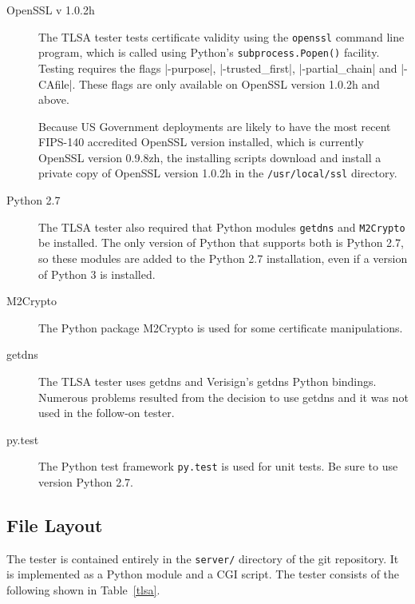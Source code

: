\documentclass[preprint,3p]{elsarticle}
\begin{document}
\begin{description}
\item[OpenSSL v 1.0.2h]
The TLSA tester tests certificate validity using the \verb+openssl+
command line program, which is called using Python's \verb+subprocess.Popen()+
facility. Testing requires the flags |-purpose|, |-trusted_first|,
|-partial_chain| and |-CAfile|. These flags are only available on
OpenSSL version 1.0.2h and above.

Because US Government deployments are likely to have the
most recent FIPS-140 accredited OpenSSL version installed, which is
currently OpenSSL version 0.9.8zh, the installing scripts download and
install a private copy of OpenSSL version 1.0.2h in the
\verb+/usr/local/ssl+ directory.

\item[Python 2.7]
The TLSA tester also required that Python modules \verb+getdns+ and
\verb+M2Crypto+ be installed. The only version of Python that supports
both is Python 2.7, so these modules are added to the Python 2.7
installation, even if a version of Python 3 is installed.

\item[M2Crypto] The Python package M2Crypto is used for some
certificate manipulations.

\item[getdns] The TLSA tester uses getdns and Verisign's getdns Python
bindings. Numerous problems resulted from the decision to use getdns
and it was not used in the follow-on tester.

\item[py.test] The Python test framework \texttt{py.test} is used
for unit tests. Be sure to use version Python 2.7.
\end{description}

\subsection{File Layout}

The tester is contained entirely in the {\tt server/} directory of the
git repository. It is implemented as a Python module and a CGI
script. The tester consists of the following shown in Table~\ref{tlsa}.
\end{document}

